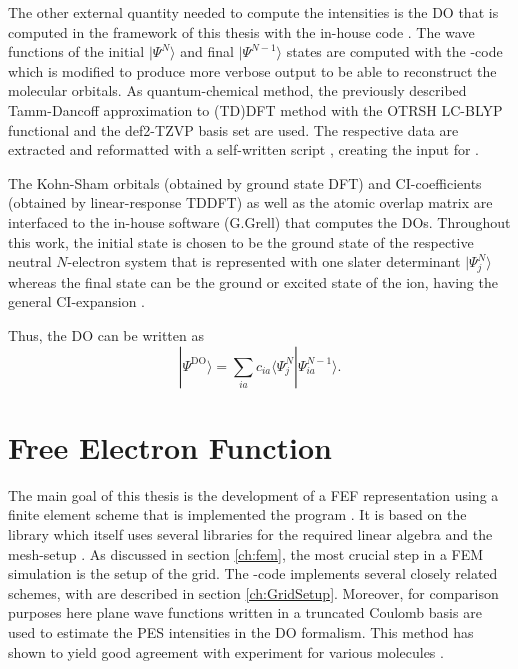 The other external quantity needed to compute the intensities is the DO that is computed in the framework of this thesis with the in-house code  \cite{MAgg}.
The wave functions of the initial $|\Psi^N\rangle$ and final $|\Psi^{N-1}\rangle$ states are computed with the -code which is modified to produce more verbose output to be able to reconstruct the molecular orbitals.
As quantum-chemical method, the previously described Tamm-Dancoff approximation to (TD)DFT method with the OTRSH LC-BLYP \cite{lc_BLYP} functional and the def2-TZVP \cite{def2tzvp} basis set are used.
The respective data are extracted and reformatted with a self-written script \cite{nwc2dy}, creating the input for .

The Kohn-Sham orbitals (obtained by ground state DFT) and CI-coefficients (obtained by linear-response TDDFT) as well as the atomic overlap matrix are interfaced to the in-house software  \cite{MAgg} (G.Grell) that computes the DOs.
Throughout this work, the initial state is chosen to be the ground state of the respective neutral $N$-electron system that is represented with one slater determinant $|\Psi_j^N\rangle$ whereas the final state can be the ground or excited state of the ion, having the general CI-expansion .

Thus, the DO can be written as
\begin{equation} \label{eq:doCI}
|\Psi^\text{DO}\rangle=\sum_{ia} c_{ia} \langle \Psi_j^N| \Psi_{ia}^{N-1} \rangle.
\end{equation}

\section{Free Electron Function}
\label{sec:grid}
The main goal of this thesis is the development of a FEF representation using a finite element scheme that is implemented the program  \cite{FreeWilly}.
It is based on the library  \cite{libmesh} which itself uses several libraries for the required linear algebra \cite{petsc, slepc1,eigen} and the mesh-setup \cite{tetgen,qhull}.
As discussed in section \ref{ch:fem}, the most crucial step in a FEM simulation is the setup of the grid.
The -code implements several closely related schemes, with are described in section \ref{ch:GridSetup}.
Moreover, for comparison purposes here plane wave functions written in a truncated Coulomb basis are used to estimate the PES intensities in the DO formalism.
This method has shown to yield good agreement with experiment for various molecules \cite{ezDyson,GrellKuehn,DO_TDDFT}.

